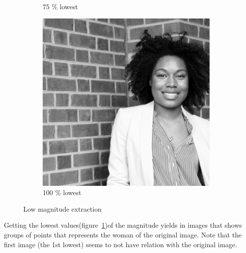 \begin{figure}[h!]
\begin{subfigure}{0.2\textwidth}
  \caption{75 \% lowest}
\end{subfigure}%
\begin{subfigure}{0.2\textwidth}
  \centering
  \includegraphics[width=0.95\linewidth]{output/magnitud_low_100.jpg}
  \caption{100 \% lowest}
\end{subfigure}%
 \caption{Low magnitude extraction}
\label{fig:low-magnitude}
\end{figure}

Getting the lowest values(figure~\ref{fig:low-magnitude})of the magnitude yields in images that shows groups of points that represents the woman of the original image. Note that the first image (the 1st lowest) seems to not have relation with the original image.

